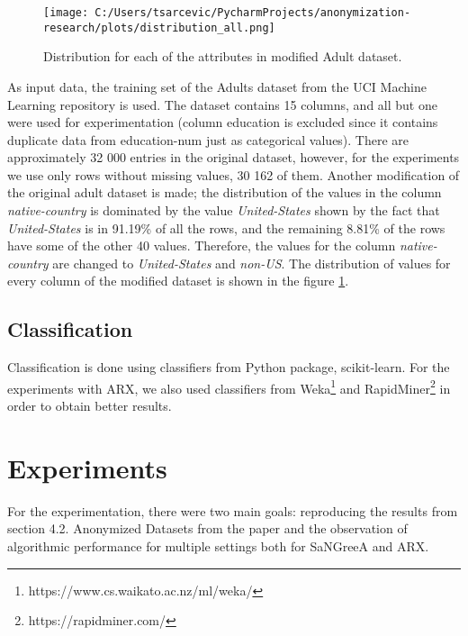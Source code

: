 \documentclass{article}
\begin{document}
\begin{figure}
	\texttt{[image: C:/Users/tsarcevic/PycharmProjects/anonymization-research/plots/distribution\_all.png]}
	\caption{Distribution for each of the attributes in modified Adult dataset.}
 	\label{fig:distribution}
\end{figure}

As input data, the training set of the Adults dataset from the UCI Machine Learning repository is used. The dataset contains 15 columns, and all but one were used for experimentation (column education is excluded since it contains duplicate data from education-num just as categorical values). There are approximately 32 000 entries in the original dataset, however, for the experiments we use only rows without missing values, 30 162 of them. Another modification of the original adult dataset is made; the distribution of the values in the column \textit{native-country} is dominated by the value \textit{United-States} shown by the fact that \textit{United-States} is in 91.19\% of all the rows, and the remaining 8.81\% of the rows have some of the other 40 values. Therefore, the values for the column \textit{native-country} are changed to \textit{United-States} and \textit{non-US}. The distribution of values for every column of the modified dataset is shown in the figure \ref{fig:distribution}.

\subsection{Classification}
Classification is done using classifiers from Python package, scikit-learn. For the experiments with ARX, we also used classifiers from Weka\footnote{https://www.cs.waikato.ac.nz/ml/weka/} and RapidMiner\footnote{https://rapidminer.com/} in order to obtain better results.

\section{Experiments} \label{experiments}
For the experimentation, there were two main goals: reproducing the results from section 4.2. Anonymized Datasets from the paper \cite{malle2017not} and the observation of algorithmic performance for multiple settings both for SaNGreeA and ARX. 
\end{document}
